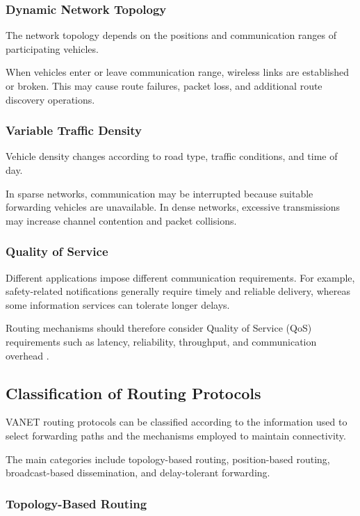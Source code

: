 \subsubsection{Dynamic Network Topology}

The network topology depends on
the positions and communication
ranges of participating vehicles.

When vehicles enter or leave
communication range, wireless
links are established or broken.
This may cause route failures,
packet loss, and additional
route discovery operations.

\subsubsection{Variable Traffic Density}

Vehicle density changes according
to road type, traffic conditions,
and time of day.

In sparse networks, communication
may be interrupted because
suitable forwarding vehicles
are unavailable. In dense
networks, excessive transmissions
may increase channel contention
and packet collisions.

\subsubsection{Quality of Service}

Different applications impose
different communication requirements.
For example, safety-related
notifications generally require
timely and reliable delivery,
whereas some information services
can tolerate longer delays.

Routing mechanisms should therefore
consider Quality of Service (QoS)
requirements such as latency,
reliability, throughput,
and communication overhead
\cite{Zeadally2012,Karagiannis2011}.

\subsection{Classification of Routing Protocols}
\label{sec:3B}

VANET routing protocols can be
classified according to the
information used to select
forwarding paths and the
mechanisms employed to
maintain connectivity.

The main categories include
topology-based routing,
position-based routing,
broadcast-based dissemination,
and delay-tolerant forwarding.

\subsubsection{Topology-Based Routing}

